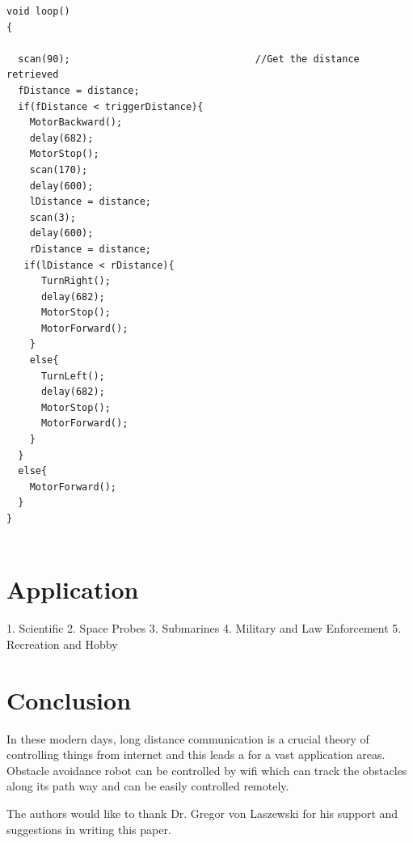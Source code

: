 \documentclass[sigconf]{acmart}
\begin{document}
\begin{lstlisting}
void loop()
{
  
  scan(90);                                //Get the distance retrieved
  fDistance = distance;
  if(fDistance < triggerDistance){
    MotorBackward();
    delay(682); 
    MotorStop();
    scan(170);
    delay(600);
    lDistance = distance;
    scan(3);
    delay(600);
    rDistance = distance;
   if(lDistance < rDistance){
      TurnRight();
      delay(682);
      MotorStop();
      MotorForward();
    }
    else{
      TurnLeft();
      delay(682);
      MotorStop();
      MotorForward();
    }
  }
  else{
    MotorForward();
  } 
}


\end{lstlisting}

\section{Application}
1. Scientific
2. Space Probes
3. Submarines
4. Military and Law Enforcement
5. Recreation and Hobby

\section{Conclusion}
In these modern days, long distance communication is a crucial theory of controlling things from internet and this leads a for a vast application areas. Obstacle avoidance robot can be controlled by wifi which can track the obstacles along its path way and can be easily controlled remotely.

\begin{acks}

The authors would like to thank Dr. Gregor von Laszewski for his support and suggestions in writing this paper.

\end{acks}


 
\end{document}
